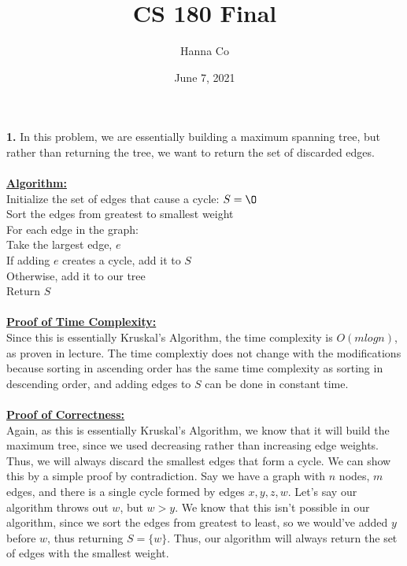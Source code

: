 \documentclass[10pt, letterpaper]{report}
\title{CS 180 Final}
\author{Hanna Co}
\date{June 7, 2021}
\newcommand\tab[1][1cm]{\hspace*{#1}}
\begin{document}
\maketitle
\noindent \large{\textbf{1.} } In this problem, we are essentially building a maximum spanning tree, but rather than returning the tree, we want to return the set of discarded edges.\\
\\
\textbf{\underline{Algorithm:}}\\
Initialize the set of edges that cause a cycle: \(S = \O \)\\
Sort the edges from greatest to smallest weight\\
For each edge in the graph:\\
\tab Take the largest edge, $e$\\
\tab If adding $e$ creates a cycle, add it to $S$\\
\tab Otherwise, add it to our tree\\
Return $S$\\
\\
\textbf{\underline{Proof of Time Complexity:}}\\
Since this is essentially Kruskal's Algorithm, the time complexity is $O(mlogn)$, as proven in lecture. The time complextiy does not change with the modifications because sorting in ascending order has the same time complexity as sorting in descending order, and adding edges to $S$ can be done in constant time.\\
\\
\textbf{\underline{Proof of Correctness:}}\\
Again, as this is essentially Kruskal's Algorithm, we know that it will build the maximum tree, since we used decreasing rather than increasing edge weights. Thus, we will always discard the smallest edges that form a cycle. We can show this by a simple proof by contradiction. Say we have a graph with $n$ nodes, $m$ edges, and there is a single cycle formed by edges $x, y, z, w$. Let's say our algorithm throws out $w$, but $w > y$. We know that this isn't possible in our algorithm, since we sort the edges from greatest to least, so we would've added $y$ before $w$, thus returning $S=\{w\}$. Thus, our algorithm will always return the set of edges with the smallest weight.
\end{document}
